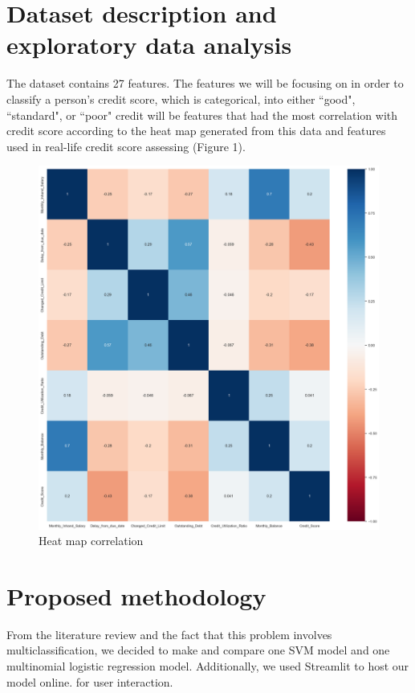 \documentclass{article}
\begin{document}
\section*{Dataset description and exploratory data analysis}
The dataset contains 27 features. The features we will be focusing on in order
to classify a person's credit score, which is categorical, into either ``good", ``standard", or ``poor" credit
will be features that had the most correlation with credit score according to the heat map
generated from this data and features used in real-life credit score assessing (Figure 1).\\
\begin{figure}[h]
    \includegraphics[width=\textwidth]{credscoreheatmap.png}
    \caption{Heat map correlation}
    \label{fig:figure1}
\end{figure}
\newpage
\section*{Proposed methodology}
From the literature review and the fact that this problem involves multiclassification,
we decided to make and compare one SVM model and one multinomial logistic regression
model. Additionally, we used Streamlit to host our model online. 
for user interaction.
\end{document}
